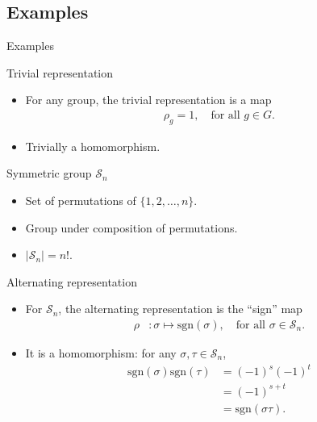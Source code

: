 \documentclass[handout, 10pt]{beamer}
\newcommand{\Sym}{\mathcal{S}}
\newcommand{\sgn}{\text{sgn}}
\begin{document}
	\subsection{Examples}
	\begin{frame}[allowframebreaks]{Examples}
		\begin{block}{Trivial representation}
			\begin{itemize}
				\item For any group, the trivial representation is a map
				\begin{align*}
					\rho_g = 1, \quad \text{for all $g \in G$.}
				\end{align*}
				
				\item Trivially a homomorphism.
			\end{itemize}
			
		\end{block}
		\framebreak
		\begin{block}{Symmetric group $\Sym_n$}
			\begin{itemize}
				\item Set of permutations of $\{1, 2, \dots, n\}$.
				
				\item Group under composition of permutations. 
				
				\item $|\Sym_n| = n!$.
			\end{itemize}
		\end{block}

		\begin{block}{Alternating representation}
			\begin{itemize}
				\item For $\Sym_n$, the alternating representation is the ``sign'' map
				\begin{align*}
					\rho &: \sigma \mapsto \sgn(\sigma), \quad \text{for all } \sigma \in \Sym_n.
				\end{align*}
				
				\item It is a homomorphism: for any $\sigma, \tau \in \Sym_n$,
				\begin{align*}
					\sgn(\sigma)\sgn(\tau) &= (-1)^s(-1)^t \\
					&= (-1)^{s+t} \\
					&= \sgn(\sigma\tau).
				\end{align*}
			\end{itemize}
		\end{block}
		

\end{frame}
\end{document}
